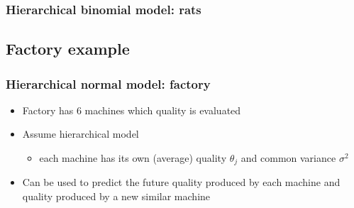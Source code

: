 \documentclass[10pt]{beamer}
\begin{document}
\begin{frame}

\frametitle{Hierarchical binomial model: rats}



\end{frame}

\subsection{Factory example}

\begin{frame}

\frametitle{Hierarchical normal model: factory}

  \begin{itemize}
  \item Factory has 6 machines which quality is evaluated
  \item Assume hierarchical model
    \begin{itemize}
    \item each machine has its own (average) quality $\theta_j$ and
      {\color{uured} common variance} $\sigma^2$
    \end{itemize}
\begin{minipage}[b]{4cm}
\begin{xy}
\end{xy}
    \end{minipage}
  \item Can be used to predict the future quality produced by each machine and quality produced by a new similar machine
  \end{itemize}
\end{frame}
\end{document}
